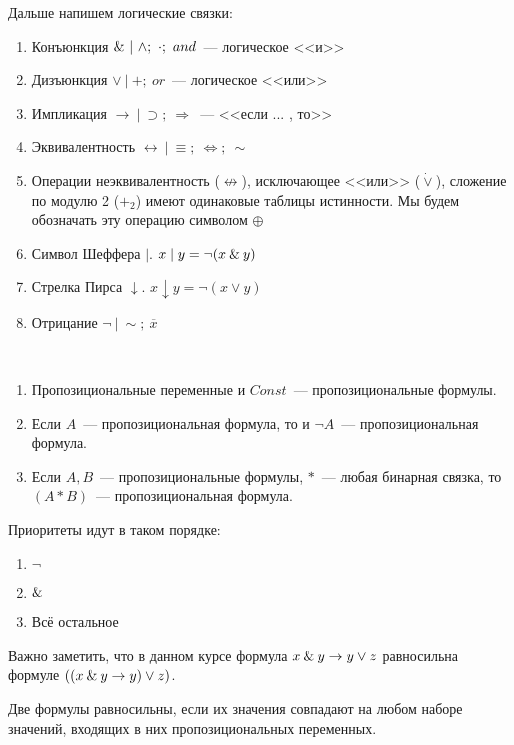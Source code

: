 \documentclass[main]{subfiles}
\begin{document}
Дальше напишем логические связки:
\begin{enumerate}
    \item Конъюнкция $\and\ |\ \land;\ \cdot;\ and $~--- логическое <<и>>
    \item Дизъюнкция $\lor\ |\ +;\ or$~---  логическое <<или>>
    \item Импликация $\to\ |\ \supset;\ \Rightarrow$~--- <<если ... , то>>
    \item Эквивалентность $\leftrightarrow\ |\ \equiv;\ \Leftrightarrow;\ \sim$
    \item Операции неэквивалентность ($\not\leftrightarrow$), исключающее <<или>> ($\dot{\lor}$), сложение по модулю 2 ($+_2$) имеют одинаковые таблицы истинности. Мы будем обозначать эту операцию символом $\oplus$
    \item Символ Шеффера $ \mid$.   $x\mid y = \lnot(x\mathbin{\&} y)$
    \item Стрелка Пирса $\downarrow$.   $x\downarrow y = \lnot(x\lor y)$
    \item Отрицание $\lnot\ |\ \sim;\ \overline{x}$
\end{enumerate}
\begin{definition}
    \

    \begin{enumerate}
        \item Пропозициональные переменные и $Const$~--- пропозициональные формулы.
        \item Если $A$~--- пропозициональная формула, то и $\lnot A$~--- пропозициональная формула.
        \item Если $A, B$~--- пропозициональные формулы, $*$~--- любая бинарная связка, то $(A * B)$~--- пропозициональная формула.
    \end{enumerate}
\end{definition}
Приоритеты идут в таком порядке:
\begin{enumerate}
    \item $\lnot$
    \item $\mathbin{\&}$
    \item Всё остальное
\end{enumerate}
\begin{remark}
    Важно заметить, что в данном курсе формула $x\mathbin{\&} y \to y\lor z$ равносильна формуле $((x\mathbin{\&} y \to y) \lor z)$.
\end{remark}
\begin{definition}
    Две формулы равносильны, если их значения совпадают на любом наборе значений, входящих в них пропозициональных переменных.
\end{definition}
\end{document}

